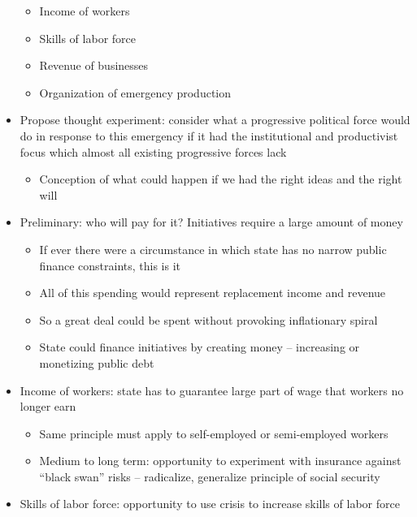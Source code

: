 \begin{itemize}
  \begin{itemize}
  \tightlist
  \item
    Income of workers
  \item
    Skills of labor force
  \item
    Revenue of businesses
  \item
    Organization of emergency production
  \end{itemize}
\item
  Propose thought experiment: consider what a progressive political
  force would do in response to this emergency if it had the
  institutional and productivist focus which almost all existing
  progressive forces lack

  \begin{itemize}
  \tightlist
  \item
    Conception of what could happen if we had the right ideas and the
    right will
  \end{itemize}
\item
  Preliminary: who will pay for it? Initiatives require a large amount
  of money

  \begin{itemize}
  \tightlist
  \item
    If ever there were a circumstance in which state has no narrow
    public finance constraints, this is it
  \item
    All of this spending would represent replacement income and revenue
  \item
    So a great deal could be spent without provoking inflationary spiral
  \item
    State could finance initiatives by creating money -- increasing or
    monetizing public debt
  \end{itemize}
\item
  Income of workers: state has to guarantee large part of wage that
  workers no longer earn

  \begin{itemize}
  \tightlist
  \item
    Same principle must apply to self-employed or semi-employed workers
  \item
    Medium to long term: opportunity to experiment with insurance
    against ``black swan'' risks -- radicalize, generalize principle of
    social security
  \end{itemize}
\item
  Skills of labor force: opportunity to use crisis to increase skills of
  labor force


\end{itemize}
